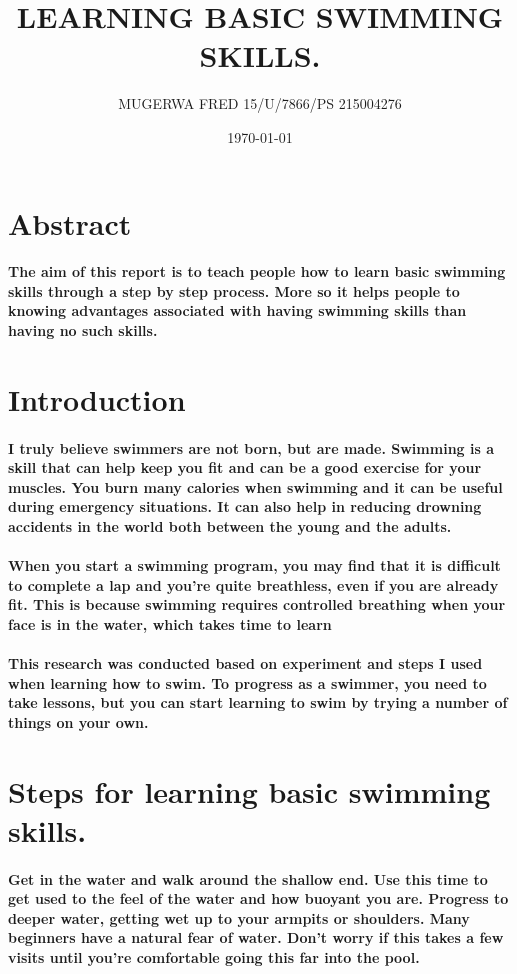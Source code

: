 \documentclass[a4paper,10.9pt]{article}
\begin{document}
\title{LEARNING BASIC SWIMMING SKILLS.}
\author{MUGERWA FRED 15/U/7866/PS 215004276}
\date{\today}
\maketitle
\section{Abstract}
\paragraph{
The aim of this report is to teach people how to learn basic swimming skills through a step by step process. More so it helps people to knowing advantages associated with having swimming skills than having no such skills.}
\section{Introduction}
\paragraph{I truly believe swimmers are not born, but are made. Swimming is a skill that can help keep you fit and can be a good exercise for your muscles. You burn many calories when swimming and it can be useful during emergency situations. It can also help in reducing drowning accidents in the world both between the young and the adults. }
\paragraph{When you start a swimming program, you may find that it is difficult to complete a lap and you're quite breathless, even if you are already fit. This is because swimming requires controlled breathing when your face is in the water, which takes time to learn }
\paragraph{This research was conducted based on experiment and steps I used when learning how to swim. 
To progress as a swimmer, you need to take lessons, but you can start learning to swim by trying a number of things on your own.}
\section{Steps for learning basic swimming skills.}
\paragraph{Get in the water and walk around the shallow end. Use this time to get used to the feel of the water and how buoyant you are. Progress to deeper water, getting wet up to your armpits or shoulders. Many beginners have a natural fear of water. Don't worry if this takes a few visits until you're comfortable going this far into the pool.}
\end{document}

